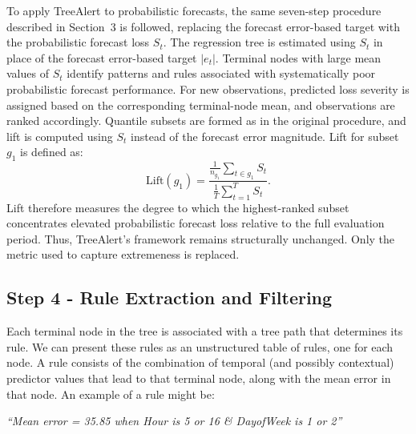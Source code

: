 \documentclass[]{interact}
\theoremstyle{plain}
\theoremstyle{definition}
\theoremstyle{remark}
\begin{document}
To apply TreeAlert to probabilistic forecasts, the same seven-step procedure described in
Section~3 is followed, replacing the forecast error-based target with the probabilistic
forecast loss $S_t$. The regression tree is estimated using $S_t$ in place of the forecast
error-based target $|e_t|$. Terminal nodes with large mean values of $S_t$ identify patterns
and rules associated with systematically poor probabilistic forecast performance. For new
observations, predicted loss severity is assigned based on the corresponding terminal-node
mean, and observations are ranked accordingly. Quantile subsets are formed as in the
original procedure, and lift is computed using $S_t$ instead of the forecast error
magnitude. Lift for subset $g_{1}$ is defined as:
\begin{equation}
\text{Lift}(g_{1}) =
\frac{
\displaystyle \frac{1}{n_{g_1}} \sum_{t \in g_{1}} S_t
}{
\displaystyle \frac{1}{T} \sum_{t=1}^{T} S_t
}.
\end{equation}
Lift therefore measures the degree to which the highest-ranked subset concentrates elevated
probabilistic forecast loss relative to the full evaluation period. Thus, TreeAlert's
framework remains structurally unchanged. Only the metric used to capture extremeness is
replaced.

\subsection{Step 4 - Rule Extraction and Filtering}
\label{sec:rule-extraction}

Each terminal node in the tree is associated with a tree path that determines its rule. We
can present these rules as an unstructured table of rules, one for each node. A rule
consists of the combination of temporal (and possibly contextual) predictor values that lead
to that terminal node, along with the mean error in that node. An example of a rule might
be:
\begin{center}
\textit{``Mean error = 35.85 when Hour is 5 or 16 \& DayofWeek is 1 or 2''}
\end{center}
\end{document}
